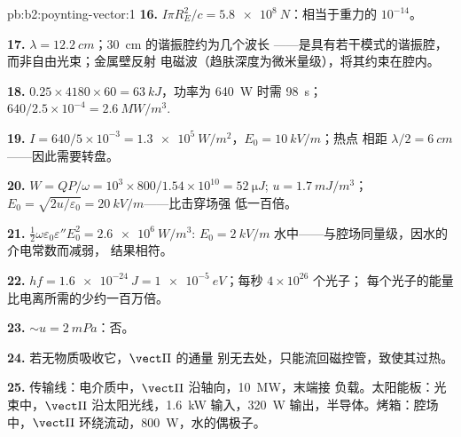 \begin{solution}{pb:b2:poynting-vector:1}
\textbf{16.} $I\pi R_E^2/c = \qty{5.8e8}{N}$：相当于重力的 $10^{-14}$。

\textbf{17.} $\lambda = \qty{12.2}{cm}$；\qty{30}{cm} 的谐振腔约为几个波长
——是具有若干模式的谐振腔，而非自由光束；金属壁反射
电磁波（趋肤深度为微米量级），将其约束在腔内。

\textbf{18.} $0.25 \times 4180 \times 60 = \qty{63}{kJ}$，功率为 \qty{640}{W} 时需 \qty{98}{s}；
$640/2.5 \times 10^{-4} = \qty{2.6}{MW/m^3}$.

\textbf{19.} $I = 640/5 \times 10^{-3} = \qty{1.3e5}{W/m^2}$，$E_0 = \qty{10}{kV/m}$；热点
相距 $\lambda/2 = \qty{6}{cm}$——因此需要转盘。

\textbf{20.} $W = QP/\omega = 10^3 \times 800/1.54 \times 10^{10} = \qty{52}{\micro J}$; $u =
\qty{1.7}{mJ/m^3}$；$E_0 = \sqrt{2u/\varepsilon_0} = \qty{20}{kV/m}$——比击穿场强
低一百倍。

\textbf{21.} $\tfrac12\omega\varepsilon_0\varepsilon''E_0^2 = \qty{2.6e6}{W/m^3}$: $E_0 = \qty{2}{kV/m}$
水中——与腔场同量级，因水的介电常数而减弱，
结果相符。

\textbf{22.} $hf = \qty{1.6e-24}{J} = \qty{1e-5}{eV}$；每秒 $4 \times 10^{26}$ 个光子；
每个光子的能量比电离所需的少约一百万倍。

\textbf{23.} $\sim u = \qty{2}{mPa}$：否。

\textbf{24.} 若无物质吸收它，$\vect\Pi$ 的通量
别无去处，只能流回磁控管，致使其过热。

\textbf{25.} 传输线：电介质中，$\vect\Pi$ 沿轴向，\qty{10}{MW}，末端接
负载。太阳能板：光束中，$\vect\Pi$ 沿太阳光线，\qty{1.6}{kW}
输入，\qty{320}{W} 输出，半导体。烤箱：腔场中，$\vect\Pi$
环绕流动，\qty{800}{W}，水的偶极子。
\end{solution}
